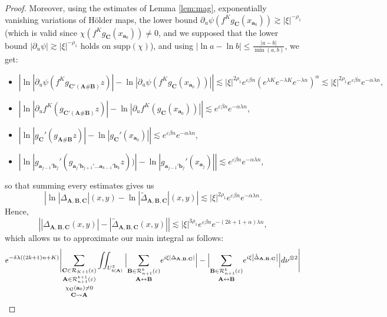 \documentclass[a4paper]{article}
\theoremstyle{definition}
\begin{document}
\begin{proof}
Moreover, using the estimates of Lemma \ref{lem:mag}, exponentially vanishing variations of Hölder maps, the lower bound $\partial_u \psi(f^K g_{\mathbf{C}}(x_{\mathbf{a}_0})) \gtrsim |\xi|^{-\rho_1} $ (which is valid since $\chi(f^K g_\mathbf{C}(x_{\mathbf{a}_0})) \neq 0$, and we supposed that the lower bound $|\partial_u \psi| \gtrsim |\xi|^{-\rho_1}$ holds on $\text{supp}(\chi)$), and using $|\ln a - \ln b| \leq \frac{|a-b|}{\min(a,b)}$, we get:
\begin{itemize}
    \item $ \left| \ln|\partial_u \psi(  f^K g_{\mathbf{C}'(\mathbf{A}\# \mathbf{B})} z )| - \ln |\partial_u \psi(f^K g_\mathbf{C}(x_{\mathbf{a}_0}))| \right| \lesssim |\xi|^{2 \rho_1} e^{\varepsilon \beta n} ( e^{\lambda K} e^{- \lambda K} e^{-\lambda n})^\alpha \lesssim |\xi|^{2 \rho_1} e^{\varepsilon \beta n }e^{- \alpha \lambda n} ,$
    \item $ \left| \ln |\partial_u f^K(g_{\mathbf{C}'(\mathbf{A} \# \mathbf{B})} z )| - \ln |\partial_u f^K(g_{\mathbf{C}} (x_{\mathbf{a}_0}) )| \right|  \lesssim e^{\varepsilon \beta n }e^{-\alpha \lambda n} $,
    \item $ \left| \ln |g_{\mathbf{C}}'(g_{\mathbf{A} \# \mathbf{B}} z )| - \ln |g_{\mathbf{C}}' (x_{\mathbf{a}_0}) | \right|  \lesssim e^{\varepsilon \beta n }e^{- \alpha \lambda n} $,
    \item $ \left| \ln|g_{\mathbf{a}_{j-1}'\mathbf{b}_j}'(g_{\mathbf{a}_j' \mathbf{b}_{j+1}' \dots \mathbf{a}_{k-1}' \mathbf{b}_k}z) )| - \ln|g_{\mathbf{a}_{j-1}' \mathbf{b}_j}'(x_{\mathbf{a}_j})| \right| \lesssim e^{\varepsilon \beta n} e^{-\alpha \lambda n} $,
\end{itemize}
so that summing every estimates gives us $$ \left| \ln |\Delta_{\mathbf{A},\mathbf{B},\mathbf{C}}|(x,y) - \ln |\tilde{\Delta}_{\mathbf{A},\mathbf{B},\mathbf{C}}|(x,y) \right| \lesssim |\xi|^{2 \rho_1} e^{\varepsilon \beta n} e^{- \alpha \lambda n}. $$
Hence, $$  \left| |\Delta_{\mathbf{A},\mathbf{B},\mathbf{C}}(x,y)| - |\tilde{\Delta}_{\mathbf{A},\mathbf{B},\mathbf{C}}(x,y)|\right| \lesssim |\xi|^{3 \rho_1} e^{\varepsilon \beta n} e^{-(2k+1+\alpha) \lambda n} ,$$
which allows us to approximate our main integral as follows:
$$e^{-\delta \lambda((2k+1)  n + K)} \Bigg{|}  \underset{\mathbf{C} \rightsquigarrow \mathbf{A}}{\underset{\chi_\mathbf{C}(\mathbf{a}_0) \neq 0}{\underset{\mathbf{A} \in \mathcal{R}_{n+1}^{k+1}(\varepsilon)}{\sum_{\mathbf{C} \in \mathcal{R}_{K+1}(\varepsilon)}}}} \iint_{U_{b(\mathbf{A})}^2 }  \Big{|} \underset{\mathbf{A} \leftrightarrow \mathbf{B}}{\sum_{\mathbf{B} \in \mathcal{R}_{n+1}^k(\varepsilon)}} e^{i \xi \left|\Delta_{\mathbf{A},\mathbf{B},\mathbf{C}}\right| } \Big| -  \Big{|} \underset{\mathbf{A} \leftrightarrow \mathbf{B}}{\sum_{\mathbf{B} \in \mathcal{R}_{n+1}^k(\varepsilon)}} e^{i \xi \left|\tilde{\Delta}_{\mathbf{A},\mathbf{B},\mathbf{C}}\right| } \Big| d\nu^{\otimes 2} \Bigg{|}  $$

\end{proof}
\end{document}
